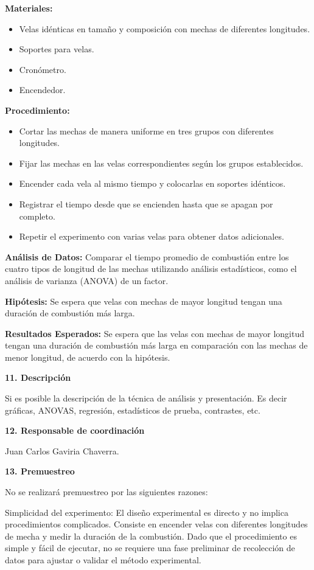 \documentclass[
  letterpaper,
  DIV=11,
  numbers=noendperiod]{scrartcl}
\begin{document}
\textbf{Materiales:}

\begin{itemize}
\item
  Velas idénticas en tamaño y composición con mechas de diferentes
  longitudes.
\item
  Soportes para velas.
\item
  Cronómetro.
\item
  Encendedor.
\end{itemize}

\textbf{Procedimiento:}

\begin{itemize}
\item
  Cortar las mechas de manera uniforme en tres grupos con diferentes
  longitudes.
\item
  Fijar las mechas en las velas correspondientes según los grupos
  establecidos.
\item
  Encender cada vela al mismo tiempo y colocarlas en soportes idénticos.
\item
  Registrar el tiempo desde que se encienden hasta que se apagan por
  completo.
\item
  Repetir el experimento con varias velas para obtener datos
  adicionales.
\end{itemize}

\textbf{Análisis de Datos:} Comparar el tiempo promedio de combustión
entre los cuatro tipos de longitud de las mechas utilizando análisis
estadísticos, como el análisis de varianza (ANOVA) de un factor.

\textbf{Hipótesis:} Se espera que velas con mechas de mayor longitud
tengan una duración de combustión más larga.

\textbf{Resultados Esperados:} Se espera que las velas con mechas de
mayor longitud tengan una duración de combustión más larga en
comparación con las mechas de menor longitud, de acuerdo con la
hipótesis.

\textbf{11. Descripción}

Si es posible la descripción de la técnica de análisis y presentación.
Es decir gráficas, ANOVAS, regresión, estadísticos de prueba,
contrastes, etc.

\textbf{12. Responsable de coordinación}

Juan Carlos Gaviria Chaverra.

\textbf{13. Premuestreo}

No se realizará premuestreo por las siguientes razones:

Simplicidad del experimento: El diseño experimental es directo y no
implica procedimientos complicados. Consiste en encender velas con
diferentes longitudes de mecha y medir la duración de la combustión.
Dado que el procedimiento es simple y fácil de ejecutar, no se requiere
una fase preliminar de recolección de datos para ajustar o validar el
método experimental.
\end{document}
